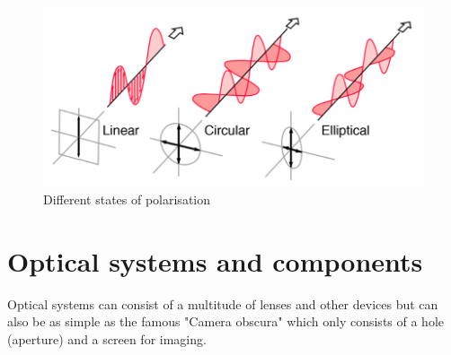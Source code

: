 \begin{figure}
\begin{center}
\includegraphics[width=12cm]{Pictures/Polarisation}
\caption[Different states of polarisation]{Different states of polarisation\cite{GSUPolarization}}
\label{Polarisation}
\end{center}
\end{figure}







\section{Optical systems and components}
Optical systems can consist of a multitude of lenses and other devices but can also be as simple as the famous "Camera obscura" which only consists of a hole (aperture) and a screen for imaging.

